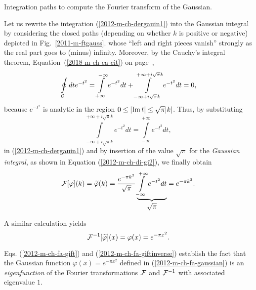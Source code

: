 {\begin{marginfigure}
\begin{center}
\begin{tikzpicture}  [scale=0.3]
\end{tikzpicture}
\end{center}
\caption{Integration paths to compute the  Fourier transform of the  Gaussian.}
\label{2011-m-ftgauss}
\end{marginfigure}
Let us rewrite the integration (\ref{2012-m-ch-dergauin1}) into the Gaussian integral by considering the closed paths
(depending on whether $k$ is positive or negative) depicted in Fig.~\ref{2011-m-ftgauss}.
whose ``left and right pieces vanish'' strongly as the real part goes to (minus) infinity.
Moreover,
by the Cauchy's integral theorem, Equation~(\ref{2018-m-ch-ca-cit}) on page~\pageref{2018-m-ch-ca-cit},
\begin{equation}
   \oint\limits_{\cal C} dt e^{-t^2}=\int\limits_{+\infty}^{-\infty}
  e^{-t^2} dt +\int\limits_{-\infty+{i\sqrt{\pi} }k}^{+\infty+{i\sqrt{\pi} }k}
   e^{-t^2} dt =0,
\end{equation}
because $e^{-t^2}$ is analytic in the region $0\le \vert {\rm Im}\,t\vert \le \sqrt{\pi }\vert k \vert$.
Thus, by substituting
\begin{equation}
 \int\limits_{-\infty+{i}\sqrt{\pi} k}^{+\infty+{i}\sqrt{\pi} k}
   e^{-t^2} dt =\int\limits_{-\infty}^{+\infty}e^{-t^2}  dt   ,
\end{equation}
in (\ref{2012-m-ch-dergauin1})
and  by insertion of the value
$\sqrt\pi$ for the {\em Gaussian integral},
as shown in  Equation (\ref{2012-m-ch-di-gi2}), we finally obtain
\begin{equation}
     {\cal F}[\varphi  ](k)=\widetilde{ \varphi} (k)=\frac{e^{-{\pi k^2 }}}{ \sqrt{\pi} }\underbrace{\int
   \limits_{-\infty}^{+\infty}e^{-t^2}dt}_{\mbox{$\sqrt\pi$}}=
   e^{-{\pi k^2}} .
\label{2012-m-ch-fa-gift}
\end{equation}

A similar calculation yields
\begin{equation}
     {\cal F}^{-1}[\widetilde{\varphi}  ](x)= \varphi (x)= e^{-{\pi x^2}} .
\label{2012-m-ch-fa-giftinverse}
\end{equation}
\eexample
}

Eqs.
(\ref{2012-m-ch-fa-gift})
and
(\ref{2012-m-ch-fa-giftinverse})
establish the fact that
the Gaussian function
$\varphi (x) = e^{-{\pi x^2}}$ defined in
(\ref{2012-m-ch-fa-gaussian})
is an {\em eigenfunction}
of the Fourier transformations
${\cal F}$
and
${\cal F}^{-1}$ with associated eigenvalue $1$.


